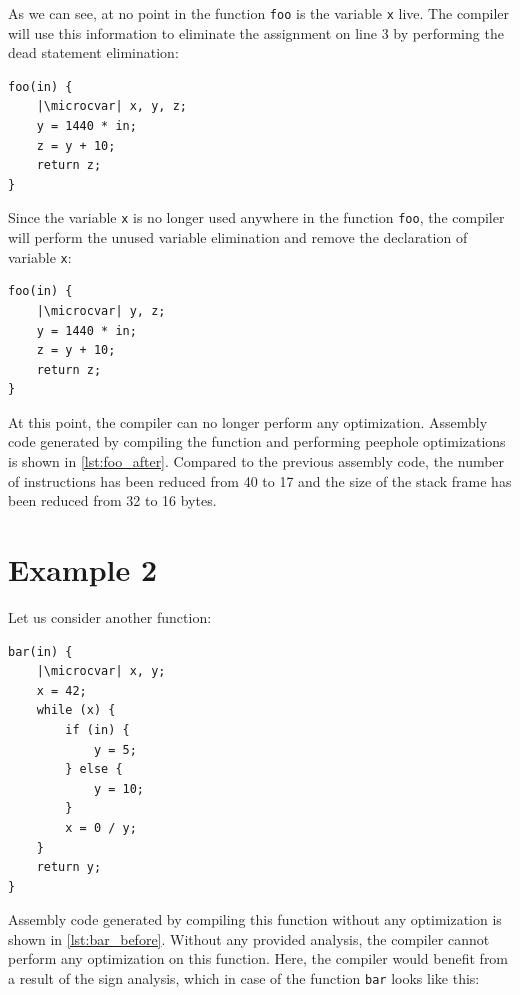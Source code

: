 \documentclass[thesis=M,english]{FITthesis}[2019/12/23]
\newcommand{\microcvar}{\textcolor{codegreen}{\textbf{var}}}
\begin{document}
As we can see, at no point in the function \texttt{foo} is the variable \texttt{x} live. The compiler will use this information to eliminate the assignment on line 3 by performing the dead statement elimination:

\begin{verbatim}
foo(in) {
	|\microcvar| x, y, z;
	y = 1440 * in;
	z = y + 10;
	return z;
}
\end{verbatim}

Since the variable \texttt{x} is no longer used anywhere in the function \texttt{foo}, the compiler will perform the unused variable elimination and remove the declaration of variable \texttt{x}:

\begin{verbatim}
foo(in) {
	|\microcvar| y, z;
	y = 1440 * in;
	z = y + 10;
	return z;
}
\end{verbatim}

At this point, the compiler can no longer perform any optimization. Assembly code generated by compiling the function and performing peephole optimizations is shown in \autoref{lst:foo_after}. Compared to the previous assembly code, the number of instructions has been reduced from 40 to 17 and the size of the stack frame has been reduced from 32 to 16 bytes.

\section{Example 2}\label{sec:optim_ex2}
Let us consider another function:

\begin{verbatim}
bar(in) {
	|\microcvar| x, y;
	x = 42;
	while (x) {
		if (in) {
			y = 5;
		} else {
			y = 10;
		}
		x = 0 / y;
	}
	return y;
}
\end{verbatim}

Assembly code generated by compiling this function without any optimization is shown in \autoref{lst:bar_before}. Without any provided analysis, the compiler cannot perform any optimization on this function. Here, the compiler would benefit from a result of the sign analysis, which in case of the function \texttt{bar} looks like this:
\end{document}
